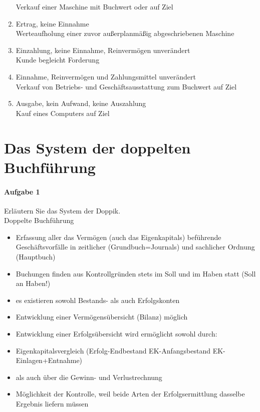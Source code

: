\documentclass[paper=a4, fontsize=11pt]{scrartcl}
\numberwithin{equation}{section}
\numberwithin{figure}{section}
\numberwithin{table}{section}
\begin{document}
\begin{enumerate}
Verkauf einer Maschine mit Buchwert oder auf Ziel
\item Ertrag, keine Einnahme \\
Werteaufholung einer zuvor außerplanmäßig abgeschriebenen Maschine 
\item Einzahlung, keine Einnahme, Reinvermögen unverändert \\
Kunde begleicht Forderung
\item Einnahme, Reinvermögen und Zahlungsmittel unverändert \\
Verkauf von Betriebs- und Geschäftsausstattung zum Buchwert auf Ziel
\item Ausgabe, kein Aufwand, keine Auszahlung \\
Kauf eines Computers auf Ziel
\end{enumerate}

\section{Das System der doppelten Buchführung}
\paragraph{Aufgabe 1}
Erläutern Sie das System der Doppik. \\

Doppelte Buchführung 
\begin{itemize}
\item Erfassung aller das Vermögen (auch das Eigenkapitals) beführende Geschäftsvorfälle in zeitlicher (Grundbuch=Journals) und sachlicher Ordnung (Hauptbuch)
\item Buchungen finden aus Kontrollgründen stets im Soll und im Haben statt (Soll an Haben!)
\item es existieren sowohl Bestands- als auch Erfolgskonten
\item Entwicklung einer Vermögensübersicht (Bilanz) möglich
\item Entwicklung einer Erfolgsübersicht wird ermöglicht sowohl durch: 
\item Eigenkapitalsvergleich (Erfolg-Endbestand EK-Anfangsbestand EK-Einlagen+Entnahme)
\item als auch über die Gewinn- und Verlustrechnung
\item Möglichkeit der Kontrolle, weil beide Arten der Erfolgsermittlung dasselbe Ergebnis liefern müssen
\end{itemize}
\end{document}
